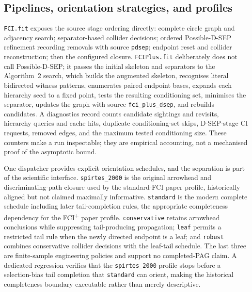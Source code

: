 \documentclass[11pt,a4paper]{article}
\newcommand{\FCIplus}{FCI\textsuperscript{+}}
\newcommand{\code}[1]{\texttt{#1}}
\begin{document}
\subsection{Pipelines, orientation strategies, and profiles}

\code{FCI.fit} exposes the source stage ordering directly: complete circle
graph and adjacency search; separator-based collider decisions; ordered
Possible-D-SEP refinement recording removals with source \code{pdsep}; endpoint
reset and collider reconstruction; then the configured closure.
\code{FCIPlus.fit} deliberately does not call Possible-D-SEP; it passes the
initial skeleton and separators to the Algorithm~2 search, which builds the
augmented skeleton, recognises literal bidirected witness patterns, enumerates
paired endpoint bases, expands each hierarchy seed to a fixed point, tests the
resulting conditioning set, minimises the separator, updates the graph with
source \code{fci\_plus\_dsep}, and rebuilds candidates. A diagnostics record
counts candidate sightings and revisits, hierarchy queries and cache hits,
duplicate conditioning-set skips, D-SEP-stage CI requests, removed edges, and
the maximum tested conditioning size. These counters make a run inspectable;
they are empirical accounting, not a mechanised proof of the asymptotic bound.

One dispatcher provides explicit orientation schedules, and the separation is
part of the scientific interface. \code{spirtes\_2000} is the original
arrowhead and discriminating-path closure used by the standard-FCI paper
profile, historically aligned but not claimed maximally informative.
\code{standard} is the modern complete schedule including later
tail-completion rules, the appropriate completeness dependency for the
\FCIplus{} paper profile. \code{conservative} retains arrowhead conclusions
while suppressing tail-producing propagation; \code{leaf} permits a restricted
tail rule when the newly directed endpoint is a leaf; and \code{robust}
combines conservative collider decisions with the leaf-tail schedule. The last
three are finite-sample engineering policies and support no completed-PAG
claim. A dedicated regression verifies that the \code{spirtes\_2000} profile
stops before a selection-bias tail completion that \code{standard} can orient,
making the historical completeness boundary executable rather than merely
descriptive.
\end{document}

